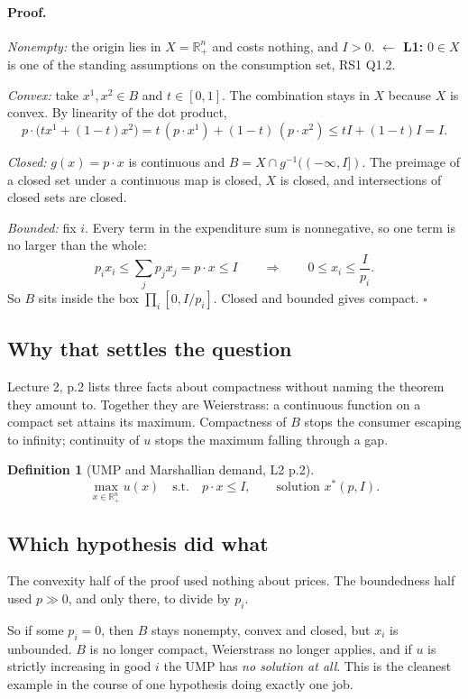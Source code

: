 \documentclass[11pt]{article}
\theoremstyle{definition}
\newtheorem{definition}{Definition}
\newcommand{\Rn}{\mathbb{R}^n_+}
\newcommand{\xs}{x^*}
\newcommand{\back}[1]{\textbf{\small $\leftarrow$ L1:} \small #1}
\begin{document}
\paragraph{Proof.} \emph{Nonempty:} the origin lies in $X=\Rn$ and costs nothing, and
$I>0$. \back{$0\in X$ is one of the standing assumptions on the consumption set, RS1 Q1.2.}

\emph{Convex:} take $x^1,x^2\in B$ and $t\in[0,1]$. The combination stays in $X$ because
$X$ is convex. By linearity of the dot product,
\[
p\cdot\big(tx^1+(1-t)x^2\big)=t\,(p\cdot x^1)+(1-t)\,(p\cdot x^2)\le tI+(1-t)I=I.
\]

\emph{Closed:} $g(x)=p\cdot x$ is continuous and $B=X\cap g^{-1}((-\infty,I])$. The preimage
of a closed set under a continuous map is closed, $X$ is closed, and intersections of closed
sets are closed.

\emph{Bounded:} fix $i$. Every term in the expenditure sum is nonnegative, so one term is no
larger than the whole:
\[
p_ix_i\le \sum_j p_jx_j = p\cdot x\le I
\qquad\Longrightarrow\qquad
0\le x_i\le \frac{I}{p_i}.
\]
So $B$ sits inside the box $\prod_i[0,I/p_i]$. Closed and bounded gives compact. \hfill$\square$

\subsection{Why that settles the question}

Lecture 2, p.2 lists three facts about compactness without naming the theorem they amount
to. Together they are Weierstrass: a continuous function on a compact set attains its
maximum. Compactness of $B$ stops the consumer escaping to infinity; continuity of $u$
stops the maximum falling through a gap.

\begin{definition}[UMP and Marshallian demand, L2 p.2]
\[
\max_{x\in\Rn} u(x)\quad\text{s.t.}\quad p\cdot x\le I,
\qquad\text{solution } \xs(p,I).
\]
\end{definition}

\subsection{Which hypothesis did what}

The convexity half of the proof used nothing about prices. The boundedness half used
$p\gg0$, and only there, to divide by $p_i$.

So if some $p_i=0$, then $B$ stays nonempty, convex and closed, but $x_i$ is unbounded. $B$
is no longer compact, Weierstrass no longer applies, and if $u$ is strictly increasing in
good $i$ the UMP has \emph{no solution at all}. This is the cleanest example in the course
of one hypothesis doing exactly one job.
\end{document}
